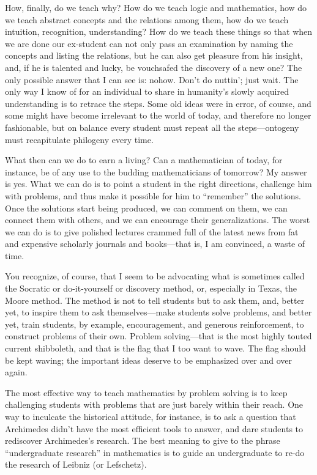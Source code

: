 \documentclass[a4paper,12pt]{article}
\begin{document}
How, finally, do we teach why?  How do we teach logic and mathematics,
how do we teach abstract concepts and the relations among them, how do
we teach intuition, recognition, understanding?  How do we teach these
things so that when we are done our ex-student can not only pass an
examination by naming the concepts and listing the relations, but he can
also get pleasure from his insight, and, if he is talented and lucky, be
vouchsafed the discovery of a new one?  The only possible answer that I
can see is: nohow.  Don’t do nuttin’; just wait.  The only way I know of
for an individual to share in humanity’s slowly acquired understanding
is to retrace the steps.  Some old ideas were in error, of course, and
some might have become irrelevant to the world of today, and therefore
no longer fashionable, but on balance every student must repeat all the
steps—ontogeny must recapitulate philogeny every time.

What then can we do to earn a living?  Can a mathematician of today, for
instance, be of any use to the budding mathematicians of tomorrow?  My
answer is yes.  What we can do is to point a student in the right
directions, challenge him with problems, and thus make it possible for him
to “remember” the solutions.  Once the solutions start being produced, we
can comment on them, we can connect them with others, and we can encourage
their generalizations.  The worst we can do is to give polished lectures
crammed full of the latest news from fat and expensive scholarly journals
and books—that is, I am convinced, a waste of time.

You recognize, of course, that I seem to be advocating what is sometimes
called the Socratic or do-it-yourself or discovery method, or, especially
in Texas, the Moore method.  The method is not to tell students but to ask
them, and, better yet, to inspire them to ask themselves—make students
solve problems, and better yet, train students, by example, encouragement,
and generous reinforcement, to construct problems of their own.  Problem
solving—that is the most highly touted current shibboleth, and that is the
flag that I too want to wave.  The flag should be kept waving; the
important ideas deserve to be emphasized over and over again.

The most effective way to teach mathematics by problem solving is to keep
challenging students with problems that are just barely within their
reach.  One way to inculcate the historical attitude, for instance, is to
ask a question that Archimedes didn’t have the most efficient tools to
answer, and dare students to rediscover Archimedes’s research.  The best
meaning to give to the phrase “undergraduate research” in mathematics is
to guide an undergraduate to re-do the research of Leibniz (or Lefschetz).
\end{document}
